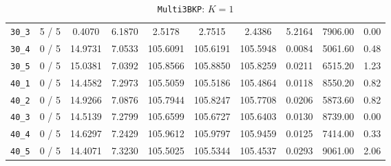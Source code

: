 \begin{table}[h!]
\begin{center}
\begin{tabular}{| c | c | c | c | c | c | c | c | c | c |}
\verb|30_3| & 5 / 5 & 0.4070 & 6.1870 & 2.5178 & 2.7515 & 2.4386 & 5.2164 & 7906.00 & 0.00\\ 
\verb|30_4| & 0 / 5 & 14.9731 & 7.0533 & 105.6091 & 105.6191 & 105.5948 & 0.0084 & 5061.60 & 0.48\\ 
\verb|30_5| & 0 / 5 & 15.0381 & 7.0392 & 105.8566 & 105.8850 & 105.8259 & 0.0211 & 6515.20 & 1.23\\ 
\verb|40_1| & 0 / 5 & 14.4582 & 7.2973 & 105.5059 & 105.5186 & 105.4864 & 0.0118 & 8550.20 & 0.82\\ 
\verb|40_2| & 0 / 5 & 14.9266 & 7.0876 & 105.7944 & 105.8247 & 105.7708 & 0.0206 & 5873.60 & 0.82\\ 
\verb|40_3| & 0 / 5 & 14.5139 & 7.2799 & 105.6599 & 105.6727 & 105.6403 & 0.0130 & 8739.00 & 0.00\\ 
\verb|40_4| & 0 / 5 & 14.6297 & 7.2429 & 105.9612 & 105.9797 & 105.9459 & 0.0125 & 7414.00 & 0.33\\ 
\verb|40_5| & 0 / 5 & 14.4071 & 7.3230 & 105.5025 & 105.5344 & 105.4537 & 0.0293 & 9061.00 & 2.06\\ 
\hline
\end{tabular}
\caption{\texttt{Multi3BKP}: $K = 1$}
\label{table:multi:1}
\end{center}
\end{table}


